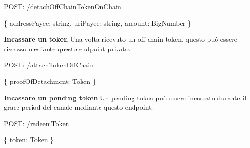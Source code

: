 \documentclass[12pt,italian,]{book}
\newenvironment{Shaded}{}{}
\newcommand{\DataTypeTok}[1]{\textcolor[rgb]{0.56,0.13,0.00}{#1}}
\newcommand{\NormalTok}[1]{#1}
\newcommand{\OperatorTok}[1]{\textcolor[rgb]{0.40,0.40,0.40}{#1}}
\newcommand{\SpecialStringTok}[1]{\textcolor[rgb]{0.73,0.40,0.53}{#1}}
\begin{document}
\begin{Shaded}
\begin{Highlighting}[]
\NormalTok{POST}\OperatorTok{:} \SpecialStringTok{/detachOffChainTokenOnChain}
\end{Highlighting}
\end{Shaded}

\begin{Shaded}
\begin{Highlighting}[]
\OperatorTok{\{}
    \DataTypeTok{addressPayee}\OperatorTok{:}\NormalTok{ string}\OperatorTok{,}
    \DataTypeTok{uriPayee}\OperatorTok{:}\NormalTok{ string}\OperatorTok{,}
    \DataTypeTok{amount}\OperatorTok{:}\NormalTok{ BigNumber}
\OperatorTok{\}}
\end{Highlighting}
\end{Shaded}

\textbf{\textbf{Incassare un token}} Una volta ricevuto un off-chain token, questo può essere riscosso mediante questo endpoint privato.

\begin{Shaded}
\begin{Highlighting}[]
\NormalTok{POST}\OperatorTok{:} \SpecialStringTok{/attachTokenOffChain}
\end{Highlighting}
\end{Shaded}

\begin{Shaded}
\begin{Highlighting}[]
\OperatorTok{\{}
    \DataTypeTok{proofOfDetachment}\OperatorTok{:}\NormalTok{ Token}
\OperatorTok{\}}
\end{Highlighting}
\end{Shaded}

\textbf{\textbf{Incassare un pending token}} Un pending token può essere incassato durante il grace period del canale mediante questo endpoint.

\begin{Shaded}
\begin{Highlighting}[]
\NormalTok{POST}\OperatorTok{:} \SpecialStringTok{/redeemToken}
\end{Highlighting}
\end{Shaded}

\begin{Shaded}
\begin{Highlighting}[]
\OperatorTok{\{}
    \DataTypeTok{token}\OperatorTok{:}\NormalTok{ Token}
\OperatorTok{\}}
\end{Highlighting}
\end{Shaded}
\end{document}
